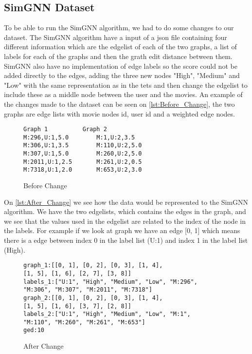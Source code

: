 \subsection{SimGNN Dataset}
To be able to run the SimGNN algorithm, we had to do some changes to our dataset. The SimGNN algorithm have a input of a json file containing four different information which are the edgelist of each of the two graphs, a list of labels for each of the graphs and then the grath edit distance between them. SimGNN also have no implementation of edge labels so the score could not be added directly to the edges, adding the three new nodes "High", "Medium" and "Low" with the same representation as in the tets and then change the edgelist to include these as a middle node between the user and the movies. 
An example of the changes made to the dataset can be seen on \autoref{lst:Before_Change}, the two graphs are edge lists with movie nodes id, user id and a weighted edge nodes. 
\begin{figure}
\begin{lstlisting}
Graph 1			 Graph 2
M:296,U:1,5.0		 M:1,U:2,3.5
M:306,U:1,3.5		 M:110,U:2,5.0
M:307,U:1,5.0		 M:260,U:2,5.0
M:2011,U:1,2.5 		 M:261,U:2,0.5
M:7318,U:1,2.0		 M:653,U:2,3.0
\end{lstlisting}
\caption{Before Change}
\label{lst:Before_Change}
\end{figure}
On \autoref{lst:After_Change} we see how the data would be represented to the SimGNN algorithm. We have the two edgelists, which contains the edges in the graph, and we see that the values used in the edgelist are related to the index of the node in the labels. For example if we look at graph we have an edge [0, 1] which means there is a edge between index 0 in the label list (U:1) and index 1 in the label list (High).
\begin{figure}
\begin{lstlisting}
graph_1:[[0, 1], [0, 2], [0, 3], [1, 4], 
[1, 5], [1, 6], [2, 7], [3, 8]]
labels_1:["U:1", "High", "Medium", "Low", "M:296", 
"M:306", "M:307", "M:2011", "M:7318"]
graph_2:[[0, 1], [0, 2], [0, 3], [1, 4], 
[1, 5], [1, 6], [3, 7], [2, 8]]
labels_2:["U:1", "High", "Medium", "Low", "M:1",
"M:110", "M:260", "M:261", "M:653"]
ged:10
\end{lstlisting}
\caption{After Change}
\label{lst:After_Change}
\end{figure}
